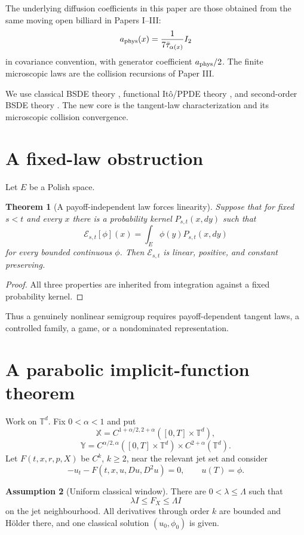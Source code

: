 \documentclass[11pt,reqno]{amsart}
\newtheorem{theorem}{Theorem}[section]
\theoremstyle{definition}
\newtheorem{assumption}[theorem]{Assumption}
\theoremstyle{remark}
\newcommand{\T}{\mathbb T}
\newcommand{\cE}{\mathcal E}
\begin{document}
The underlying diffusion coefficients in this paper are those obtained from
the same moving open billiard in Papers I--III:
\[
 a_{\rm phys}(x)
 =
 \frac1{7\bar\tau_{\alpha(x)}}I_2
\]
in covariance convention, with generator coefficient $a_{\rm phys}/2$.
The finite microscopic laws are the collision recursions of Paper III.

We use classical BSDE theory \cite{PardouxPeng1990,Kobylanski2000},
functional It\^o/PPDE theory \cite{Dupire2009,ContFournie2013,
EkrenTouziZhang2014}, and second-order BSDE theory
\cite{SonerTouziZhang2012}.  The new core is the tangent-law
characterization and its microscopic collision convergence.

\section{A fixed-law obstruction}\label{sec:obstruction}

Let $E$ be a Polish space.

\begin{theorem}[A payoff-independent law forces linearity]\label{thm:fixed-law}
Suppose that for fixed $s<t$ and every $x$ there is a probability kernel
$P_{s,t}(x,dy)$ such that
\[
 \cE_{s,t}[\phi](x)
 =
 \int_E\phi(y)P_{s,t}(x,dy)
\]
for every bounded continuous $\phi$.  Then $\cE_{s,t}$ is linear, positive,
and constant preserving.
\end{theorem}

\begin{proof}
All three properties are inherited from integration against a fixed
probability kernel.
\end{proof}

Thus a genuinely nonlinear semigroup requires payoff-dependent tangent laws,
a controlled family, a game, or a nondominated representation.

\section{A parabolic implicit-function theorem}\label{sec:ift}

Work on $\T^d$.  Fix $0<\alpha<1$ and put
\[
 \mathbb X=C^{1+\alpha/2,2+\alpha}([0,T]\times\T^d),
\]
\[
 \mathbb Y=
 C^{\alpha/2,\alpha}([0,T]\times\T^d)
 \times C^{2+\alpha}(\T^d).
\]
Let $F(t,x,r,p,X)$ be $C^k$, $k\ge2$, near the relevant jet set and consider
\[
 -u_t-F(t,x,u,Du,D^2u)=0,\qquad u(T)=\phi.
\]

\begin{assumption}[Uniform classical window]\label{ass:window}
There are $0<\lambda\le\Lambda$ such that
\[
 \lambda I\le F_X\le\Lambda I
\]
on the jet neighbourhood.  All derivatives through order $k$ are bounded and
H\"older there, and one classical solution $(u_0,\phi_0)$ is given.
\end{assumption}
\end{document}
